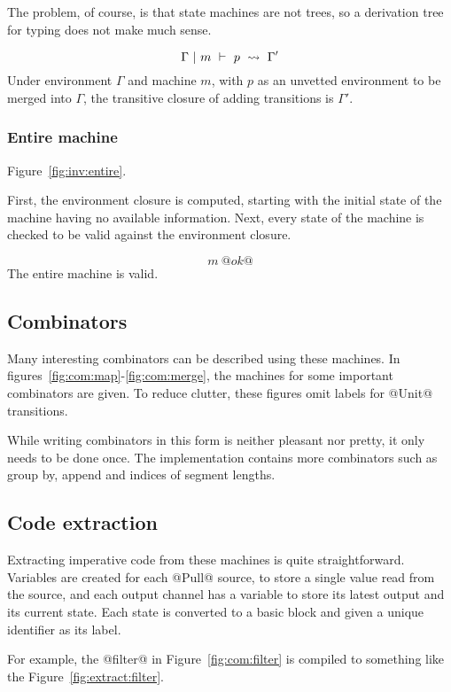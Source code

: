 The problem, of course, is that state machines are not trees, so a derivation tree for typing does not make much sense.

$$ \Gamma ~|~ m ~\vdash~ p ~\rightsquigarrow~ \Gamma' $$
Under environment $\Gamma$ and machine $m$, with $p$ as an unvetted environment to be merged into $\Gamma$, the transitive closure of adding transitions is $\Gamma'$.

\subsubsection{Entire machine}
Figure~\ref{fig:inv:entire}.

First, the environment closure is computed, starting with the initial state of the machine having no available information.
Next, every state of the machine is checked to be valid against the environment closure.

$$ m~@ok@ $$
The entire machine is valid.


\subsection{Combinators}
Many interesting combinators can be described using these machines.
In figures~\ref{fig:com:map}-\ref{fig:com:merge}, the machines for some important combinators are given.
To reduce clutter, these figures omit labels for @Unit@ transitions.

While writing combinators in this form is neither pleasant nor pretty, it only needs to be done once.
The implementation contains more combinators such as group by, append and indices of segment lengths.





\subsection{Code extraction}

Extracting imperative code from these machines is quite straightforward.
Variables are created for each @Pull@ source, to store a single value read from the source, and each output channel has a variable to store its latest output and its current state.
Each state is converted to a basic block and given a unique identifier as its label.

For example, the @filter@ in Figure~\ref{fig:com:filter} is compiled to something like the Figure~\ref{fig:extract:filter}.


